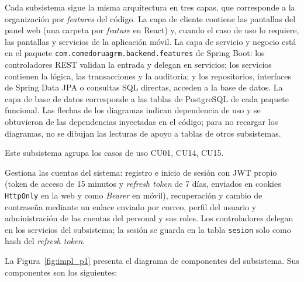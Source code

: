 \label{sec:cap8_arquitectura_subsistema}

Cada subsistema sigue la misma arquitectura en tres capas, que corresponde a la organización por \textit{features} del código. La capa de cliente contiene las pantallas del panel web (una carpeta por \textit{feature} en React) y, cuando el caso de uso lo requiere, las pantallas y servicios de la aplicación móvil. La capa de servicio y negocio está en el paquete \texttt{com.comedoruagrm.backend.features} de Spring Boot: los controladores REST validan la entrada y delegan en servicios; los servicios contienen la lógica, las transacciones y la auditoría; y los repositorios, interfaces de Spring Data JPA o consultas SQL directas, acceden a la base de datos. La capa de base de datos corresponde a las tablas de PostgreSQL de cada paquete funcional. Las flechas de los diagramas indican dependencia de uso y se obtuvieron de las dependencias inyectadas en el código; para no recargar los diagramas, no se dibujan las lecturas de apoyo a tablas de otros subsistemas.


\label{sec:cap8_sub_p1}

Este subsistema agrupa los casos de uso CU01, CU14, CU15.

Gestiona las cuentas del sistema: registro e inicio de sesión con JWT propio (token de acceso de 15 minutos y \textit{refresh token} de 7 días, enviados en cookies \texttt{HttpOnly} en la web y como \textit{Bearer} en móvil), recuperación y cambio de contraseña mediante un enlace enviado por correo, perfil del usuario y administración de las cuentas del personal y sus roles. Los controladores delegan en los servicios del subsistema; la sesión se guarda en la tabla \texttt{sesion} solo como hash del \textit{refresh token}.

La Figura~\ref{fig:impl_p1} presenta el diagrama de componentes del subsistema. Sus componentes son los siguientes:

